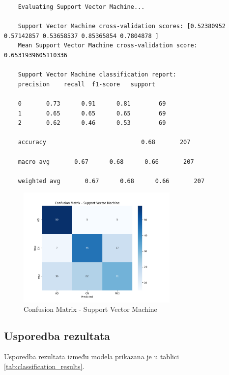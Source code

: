 \documentclass[zavrsnirad]{fer}
\begin{document}
\begin{verbatim}
	Evaluating Support Vector Machine...
	
	Support Vector Machine cross-validation scores: [0.52380952 0.57142857 0.53658537 0.85365854 0.7804878 ]
	Mean Support Vector Machine cross-validation score: 0.6531939605110336
	
	Support Vector Machine classification report:
	precision    recall  f1-score   support
	
	0       0.73      0.91      0.81        69
	1       0.65      0.65      0.65        69
	2       0.62      0.46      0.53        69
	
	accuracy                           0.68       207
	
	macro avg       0.67      0.68      0.66       207
	
	weighted avg       0.67      0.68      0.66       207
\end{verbatim}

\begin{figure}[h]
	\centering
	\includegraphics[width=0.7\textwidth]{Figures/matrix_svm_2.png}
	\caption{Confusion Matrix - Support Vector Machine}
	\label{fig:matrix_svm}
\end{figure}

\subsection{Usporedba rezultata}

Usporedba rezultata između modela prikazana je u tablici \ref{tab:classification_results}.
\end{document}
